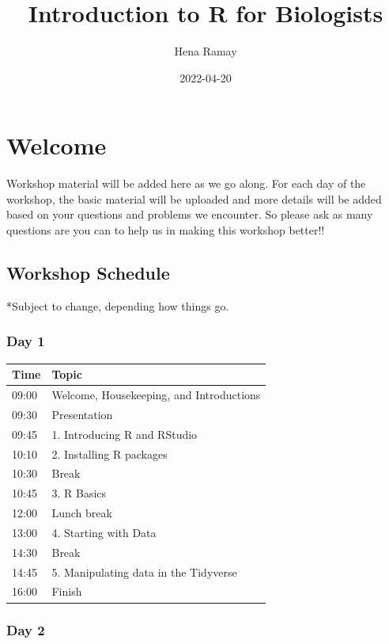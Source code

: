 \documentclass[
]{book}
\title{Introduction to R for Biologists}
\author{Hena Ramay}
\date{2022-04-20}
\begin{document}
\maketitle

{
\setcounter{tocdepth}{1}
\tableofcontents
}
\hypertarget{welcome}{%
\chapter{Welcome}\label{welcome}}

Workshop material will be added here as we go along. For each day of the workshop, the basic material will be uploaded and more details will be added based on your questions and problems we encounter. So please ask as many questions are you can to help us in making this workshop better!!

\hypertarget{workshop-schedule}{%
\section{Workshop Schedule}\label{workshop-schedule}}

*Subject to change, depending how things go.

\hypertarget{day-1}{%
\subsection*{Day 1}\label{day-1}}

\begin{longtable}[]{@{}ll@{}}
\toprule
Time & Topic \\
\midrule
\endhead
09:00 & Welcome, Housekeeping, and Introductions \\
09:30 & Presentation \\
09:45 & 1. Introducing R and RStudio \\
10:10 & 2. Installing R packages \\
10:30 & Break \\
10:45 & 3. R Basics \\
12:00 & Lunch break \\
13:00 & 4. Starting with Data \\
14:30 & Break \\
14:45 & 5. Manipulating data in the Tidyverse \\
16:00 & Finish \\
\bottomrule
\end{longtable}

\hypertarget{day-2}{%
\subsection*{Day 2}\label{day-2}}
\end{document}
